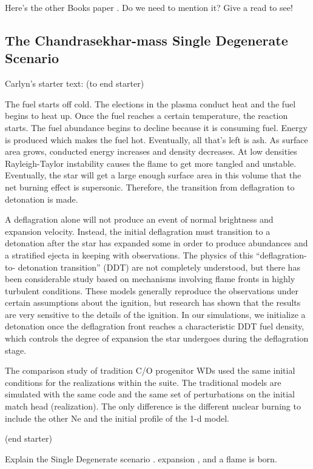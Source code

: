 \documentclass[iop,apj]{emulateapj}
\begin{document}
Here's the other Books paper \citep{brookset2017}. Do we need to mention it?
Give a read to see!


\subsection{The Chandrasekhar-mass Single Degenerate Scenario}


Carlyn's starter text: (to end starter)

The fuel starts off cold. The elections in the plasma conduct heat
and the fuel begins to heat up. Once the fuel reaches a certain
temperature, the reaction starts. The fuel abundance begins to
decline because it is consuming fuel. Energy is produced which
makes the fuel hot. Eventually, all that’s left is ash. As
surface area grows, conducted energy increases and density
decreases. At low densities Rayleigh-Taylor instability causes
the flame to get more tangled and unstable. Eventually, the
star will get a large enough surface area in this volume that
the net burning effect is supersonic. Therefore, the transition
from deflagration to detonation is made.

A deflagration alone will not produce an event of normal
brightness and expansion velocity. Instead, the initial
deflagration must transition to a detonation after the star has
expanded some in order to produce abundances and a stratified
ejecta in keeping with observations. The physics of this
“deflagration-to- detonation transition” (DDT) are not
completely understood, but there has been considerable study
based on mechanisms involving flame fronts in highly turbulent
conditions. These models generally reproduce the observations
under certain assumptions about the ignition, but research has
shown that the results are very sensitive to the details of the
ignition. In our simulations, we initialize a detonation once
the deflagration front reaches a characteristic DDT fuel density,
which controls the degree of expansion the star undergoes during
the deflagration stage.

The comparison study of tradition C/O progenitor WDs used the same initial
conditions for the realizations within the suite. The traditional models
are simulated with the same code and the same set of perturbations on the
initial match head (realization). The only difference is the different
nuclear burning to include the other Ne and the initial profile of the
1-d model. 

(end starter)


Explain the Single Degenerate scenario
\citep{Baraffe2004Stability-of-Su,WoosWunsKuhl04,wunschwoosley2004,Kuhletal06,nonakaetal2012}.
expansion \citep{Nomo84,WoosWunsKuhl04}, and a flame is born. 
\end{document}
